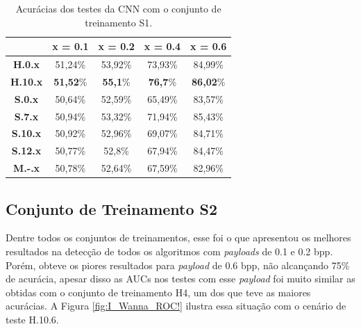 \begin{table}[!ht]
\centering
\begin{tabular}{c|c|c|c|c|}
\cline{2-5}
\textbf{}                               & \textbf{x = 0.1}	& \textbf{x = 0.2}	& \textbf{x = 0.4}	& \textbf{x = 0.6}	\\ \hline
\multicolumn{1}{|c|}{\textbf{H.0.x}}	& 51,24\%			& 53,92\%			& 73,93\%			& 84,99\%			\\ \hline
\multicolumn{1}{|c|}{\textbf{H.10.x}}	& \textbf{51,52}\%	& \textbf{55,1}\%	& \textbf{76,7}\%	& \textbf{86,02}\%	\\ \hline
\multicolumn{1}{|c|}{\textbf{S.0.x}}	& 50,64\%			& 52,59\%			& 65,49\%			& 83,57\%			\\ \hline
\multicolumn{1}{|c|}{\textbf{S.7.x}}	& 50,94\%			& 53,32\%			& 71,94\%			& 85,43\%			\\ \hline
\multicolumn{1}{|c|}{\textbf{S.10.x}}	& 50,92\%			& 52,96\%			& 69,07\%			& 84,71\%			\\ \hline
\multicolumn{1}{|c|}{\textbf{S.12.x}}	& 50,77\%			& 52,8\%			& 67,94\%			& 84,47\%			\\ \hline
\multicolumn{1}{|c|}{\textbf{M.-.x}}	& 50,78\%			& 52,64\%			& 67,59\%			& 82,96\%			\\ \hline
\end{tabular}
\caption{Acurácias dos testes da CNN com o conjunto de treinamento S1.}
\label{tab:cnn_s1}
\end{table}


\subsection{Conjunto de Treinamento S2}

Dentre todos os conjuntos de treinamentos, esse foi o que apresentou os melhores resultados na detecção de todos os algoritmos com \textit{payloads} de 0.1 e 0.2 bpp. Porém, obteve os piores resultados para \textit{payload} de 0.6 bpp, não alcançando 75\% de acurácia, apesar disso as AUCs nos testes com esse \textit{payload} foi muito similar as obtidas com o conjunto de treinamento H4, um dos que teve as maiores acurácias. A Figura \ref{fig:I_Wanna_ROC!} ilustra essa situação com o cenário de teste H.10.6.

